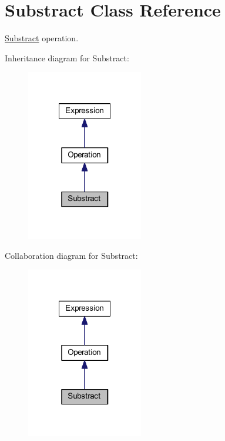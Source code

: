 \hypertarget{class_substract}{\section{Substract Class Reference}
\label{class_substract}
}


\hyperlink{class_substract}{Substract} operation.  




Inheritance diagram for Substract\-:\nopagebreak
\begin{figure}[H]
\begin{center}
\leavevmode
\includegraphics[width=144pt]{class_substract__inherit__graph}
\end{center}
\end{figure}


Collaboration diagram for Substract\-:\nopagebreak
\begin{figure}[H]
\begin{center}
\leavevmode
\includegraphics[width=144pt]{class_substract__coll__graph}
\end{center}
\end{figure}
